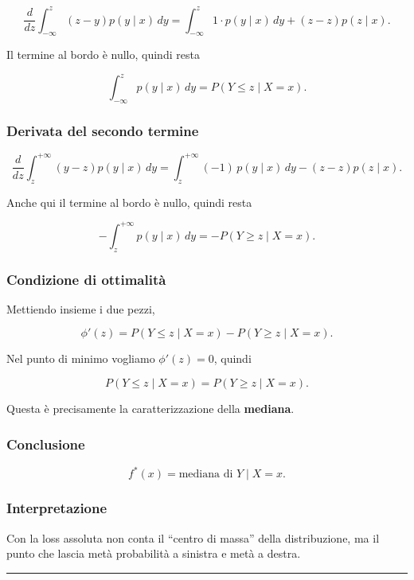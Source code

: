 \documentclass{article}
\begin{document}
\[
\frac{d}{dz}\int_{-\infty}^{z}(z-y)p(y\mid x)\,dy
=
\int_{-\infty}^{z}1\cdot p(y\mid x)\,dy + (z-z)p(z\mid x).
\]

Il termine al bordo è nullo, quindi resta

\[
\int_{-\infty}^{z}p(y\mid x)\,dy = P(Y\le z\mid X=x).
\]

\subsubsection{Derivata del secondo
termine}\label{derivata-del-secondo-termine}

\[
\frac{d}{dz}\int_{z}^{+\infty}(y-z)p(y\mid x)\,dy
=
\int_{z}^{+\infty}(-1)\,p(y\mid x)\,dy -(z-z)p(z\mid x).
\]

Anche qui il termine al bordo è nullo, quindi resta

\[
-\int_{z}^{+\infty}p(y\mid x)\,dy = -P(Y\ge z\mid X=x).
\]

\subsubsection{Condizione di
ottimalità}\label{condizione-di-ottimalituxe0}

Mettiendo insieme i due pezzi,

\[
\phi'(z)=P(Y\le z\mid X=x)-P(Y\ge z\mid X=x).
\]

Nel punto di minimo vogliamo \(\phi'(z)=0\), quindi

\[
P(Y\le z\mid X=x)=P(Y\ge z\mid X=x).
\]

Questa è precisamente la caratterizzazione della \textbf{mediana}.

\subsubsection{Conclusione}\label{conclusione-1}

\[
f^*(x)=\text{mediana di }Y\mid X=x.
\]

\subsubsection{Interpretazione}\label{interpretazione-1}

Con la loss assoluta non conta il ``centro di massa'' della
distribuzione, ma il punto che lascia metà probabilità a sinistra e metà
a destra.

\begin{center}\rule{0.5\linewidth}{0.5pt}\end{center}
\end{document}
